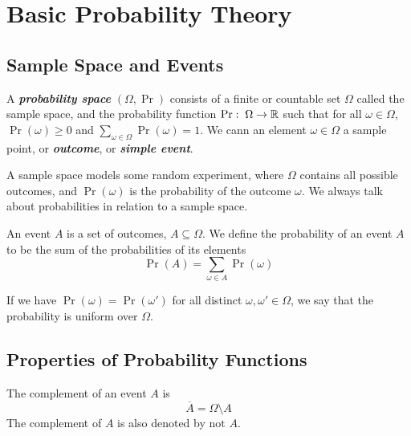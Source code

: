 \section{Basic Probability Theory}

\subsection{Sample Space and Events}

\vspace{\parskip}

\begin{definition}    
    A \textit{\textbf{probability space}} $(\Omega, \Pr)$ consists of a finite or countable set $\Omega$ called the sample space, and the probability function $\Pr:\; \Omega \to \mathbb{R}$ such that for all $\omega \in \Omega$, $\Pr(\omega) \geq 0$ and $\sum_{\omega \in \Omega} \Pr(\omega) = 1$. We cann an element $\omega \in \Omega$ a sample point, or \textit{\textbf{outcome}}, or \textit{\textbf{simple event}}.
\end{definition}

A sample space models some random experiment, where $\Omega$ contains all possible outcomes, and $\Pr(\omega)$ is the probability of the outcome $\omega$. We always talk about probabilities in relation to a sample space.

\begin{definition}[Event]
    An event $A$ is a set of outcomes, $A \subseteq \Omega$. We define the probability of an event $A$ to be the sum of the probabilities of its elements
    $$
    \Pr(A) = \sum_{\omega \in A} \Pr(\omega)
    $$ 
\end{definition}

If we have $\Pr(\omega) = \Pr(\omega')$ for all distinct $\omega, \omega' \in \Omega$, we say that the probability is uniform over $\Omega$.

\subsection{Properties of Probability Functions}

\vspace{\parskip}

\begin{definition}[Complement] 
    The complement of an event $A$ is
    $$
    \overline{A} = \Omega \setminus A
    $$
    The complement of $A$ is also denoted by $\text{not }A$. 
\end{definition}

